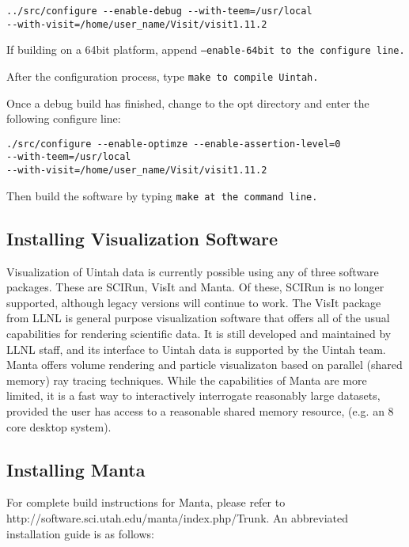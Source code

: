 \begin{Verbatim}[fontsize=\footnotesize]
../src/configure --enable-debug --with-teem=/usr/local
--with-visit=/home/user_name/Visit/visit1.11.2
\end{Verbatim}

If building on a 64bit platform, append \tt --enable-64bit \normalfont
to the configure line.

After the configuration process, type \tt make \normalfont to compile
Uintah.

Once a debug build has finished, change to the opt directory and enter
the following configure line:

\begin{Verbatim}[fontsize=\footnotesize]
./src/configure --enable-optimze --enable-assertion-level=0 
--with-teem=/usr/local
--with-visit=/home/user_name/Visit/visit1.11.2
\end{Verbatim}

Then build the software by typing \tt make \normalfont at the command line.

\subsection{Installing Visualization Software}

Visualization of Uintah data is currently possible using any of three
software packages.  These are SCIRun, VisIt and Manta.  Of these, SCIRun is
no longer supported, although legacy versions will continue to work.  The
VisIt package from LLNL is general purpose visualization software that offers
all of the usual capabilities for rendering scientific data.  It is still
developed and maintained by LLNL staff, and its interface to Uintah data is
supported by the Uintah team.  Manta offers volume rendering and particle
visualizaton based on parallel (shared memory) ray tracing techniques.
While the capabilities of Manta are more limited, it is a fast way to
interactively interrogate reasonably large datasets, provided the user has
access to a reasonable shared memory resource, (e.g. an 8 core desktop system).

\subsection{Installing Manta}

For complete build instructions for Manta, please refer to
http://software.sci.utah.edu/manta/index.php/Trunk.  An abbreviated
installation guide is as follows:

